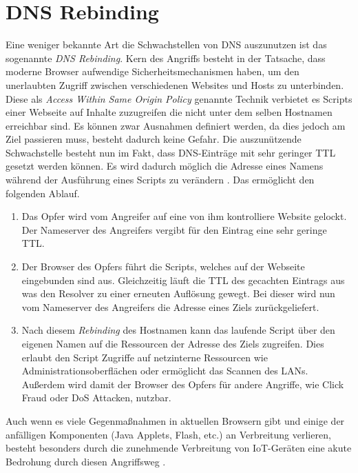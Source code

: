 \section{DNS Rebinding}
\label{sec:attack-dnsrebind}

Eine weniger bekannte Art die Schwachstellen von DNS auszunutzen ist das sogenannte \textit{DNS Rebinding}. Kern des Angriffs besteht in der Tatsache, dass moderne Browser aufwendige Sicherheitsmechanismen haben, um den unerlaubten Zugriff zwischen verschiedenen Websites und Hosts zu unterbinden. Diese als \textit{Access Within Same Origin Policy} genannte Technik verbietet es Scripts einer Webseite auf Inhalte zuzugreifen die nicht unter dem selben Hostnamen erreichbar sind. Es können zwar Ausnahmen definiert werden, da dies jedoch am Ziel passieren muss, besteht dadurch keine Gefahr. Die auszunützende Schwachstelle besteht nun im Fakt, dass DNS-Einträge mit sehr geringer TTL gesetzt werden können. Es wird dadurch möglich die Adresse eines Namens während der Ausführung eines Scripts zu verändern \cite{Jackson2009}. Das ermöglicht den folgenden Ablauf.

\begin{enumerate}
    \item Das Opfer wird vom Angreifer auf eine von ihm kontrolliere Website gelockt. Der Nameserver des Angreifers vergibt für den Eintrag eine sehr geringe TTL.
    \item Der Browser des Opfers führt die Scripts, welches auf der Webseite eingebunden sind aus. Gleichzeitig läuft die TTL des gecachten Eintrags aus was den Resolver zu einer erneuten Auflösung gewegt. Bei dieser wird nun vom Nameserver des Angreifers die Adresse eines Ziels zurückgeliefert.
    \item Nach diesem \textit{Rebinding} des Hostnamen kann das laufende Script über den eigenen Namen auf die Ressourcen der Adresse des Ziels zugreifen. Dies erlaubt den Script Zugriffe auf netzinterne Ressourcen wie Administrationsoberflächen oder ermöglicht das Scannen des LANs. Außerdem wird damit der Browser des Opfers für andere Angriffe, wie Click Fraud oder DoS Attacken, nutzbar.   
\end{enumerate}

Auch wenn es viele Gegenmaßnahmen in aktuellen Browsern gibt und einige der anfälligen Komponenten (Java Applets, Flash, etc.) an Verbreitung verlieren, besteht besonders durch die zunehmende Verbreitung von IoT-Geräten eine akute Bedrohung durch diesen Angriffsweg \cite{Dorsey2018}. 

